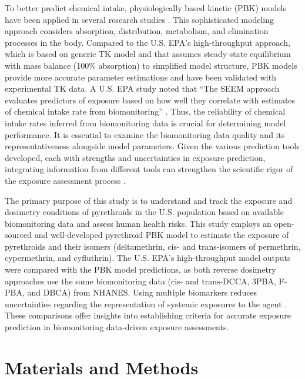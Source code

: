 \documentclass[toxics,article,submit,pdftex,moreauthors]{Definitions/mdpi}
\begin{document}
To better predict chemical intake, physiologically based kinetic (PBK)
models have been applied in several research studies
\citep{tan2006use, allen2007use, lyons2008computational, tornero2012pharmacokinetic, moreau2017using}.
This sophisticated modeling approach considers absorption, distribution,
metabolism, and elimination processes in the body. Compared to the U.S.
EPA's high-throughput approach, which is based on generic TK model and
that assumes steady-state equilibrium with mass balance (100\%
absorption) to simplified model structure, PBK models provide more
accurate parameter estimations and have been validated with experimental
TK data. A U.S. EPA study noted that ``The SEEM approach evaluates
predictors of exposure based on how well they correlate with estimates
of chemical intake rate from biomonitoring'' \citep{ring2018consensus}.
Thus, the reliability of chemical intake rates inferred from
biomonitoring data is crucial for determining model performance. It is
essential to examine the biomonitoring data quality and its
representativeness alongside model parameters. Given the various
prediction tools developed, each with strengths and uncertainties in
exposure prediction, integrating information from different tools can
strengthen the scientific rigor of the exposure assessment process
\citep{moreau2017using}.

The primary purpose of this study is to understand and track the
exposure and dosimetry conditions of pyrethroids in the U.S. population
based on available biomonitoring data and assess human health risks.
This study employs an open-sourced and well-developed pyrethroid PBK
model to estimate the exposure of pyrethroids and their isomers
(deltamethrin, cis- and trans-isomers of permethrin, cypermethrin, and
cyfluthrin). The U.S. EPA's high-throughput model outputs were compared
with the PBK model predictions, as both reverse dosimetry approaches use
the same biomonitoring data (cis- and trans-DCCA, 3PBA, F-PBA, and DBCA)
from NHANES. Using multiple biomarkers reduces uncertainties regarding
the representation of systemic exposures to the agent
\citep{lin2023reconstructing}. These comparisons offer insights into
establishing criteria for accurate exposure prediction in biomonitoring
data-driven exposure assessments.



\section{Materials and Methods}\label{materials-and-methods}
\end{document}
